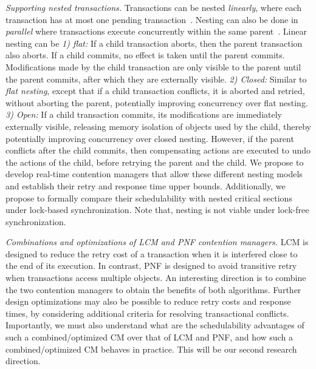 \textit{Supporting nested transactions.} Transactions can be nested \textit{linearly}, where each transaction has at most one pending transaction~\cite{Moss2006186}. Nesting can also be done in \textit{parallel} where transactions execute concurrently within the same parent~\cite{volos2009nepaltm}. Linear nesting can be \textit{1) flat:} If a child transaction aborts, then the parent transaction also aborts. If a child commits, no effect is taken until the parent commits. Modifications made by the child transaction are only visible to the parent until the parent commits, after which they are externally visible. 
%
\textit{2) Closed:} Similar to \textit{flat nesting}, except that if a child transaction conflicts, it is aborted and retried, without aborting the parent, potentially improving concurrency over flat nesting. 
%
\textit{3) Open:} If a child transaction commits, its modifications are immediately externally visible, releasing memory isolation  of objects used by the child, thereby potentially improving concurrency over closed nesting. However, if the parent conflicts after the child commits, then compensating actions are executed to undo the actions of the child, before retrying the parent and the child. 
We propose to develop real-time contention managers that allow these different nesting models and establish their retry and response time upper bounds. Additionally, we propose to formally compare their schedulability with nested critical sections under lock-based synchronization. Note that, nesting is not viable under lock-free synchronization. 


\textit{Combinations and optimizations of LCM and PNF contention managers.} LCM is designed to reduce the retry cost of a transaction when it is interfered close to the end of its execution. In contrast, PNF is designed to avoid transitive retry when transactions access multiple objects. An interesting direction is to combine the two contention managers to obtain the benefits of both algorithms. Further design optimizations may also be possible to reduce retry costs and response times, by considering additional criteria for resolving transactional conflicts. Importantly, we must also understand what are the schedulability advantages of such a combined/optimized CM over that of LCM and PNF, and how such a combined/optimized CM behaves in practice. This will be our second research direction. 

